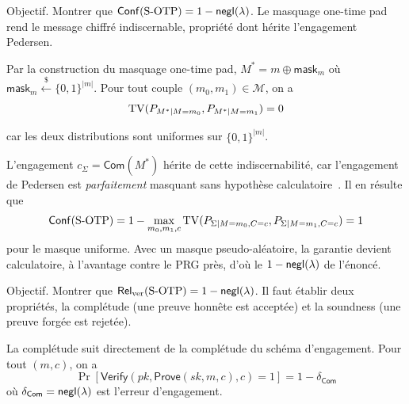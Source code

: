 \begin{sloppypar}
\begin{Preuve}
\begin{cmtEtape}{Objectif.}
Montrer que $\mathsf{Conf}(\text{S-OTP}) = 1 - \mathsf{negl}(\lambda)$. Le masquage
one-time pad rend le message chiffr\'e indiscernable, propri\'et\'e dont
h\'erite l'engagement Pedersen.
\end{cmtEtape}

Par la construction du masquage one-time pad, $M^* = m \oplus \mathsf{mask}_m$
o\`u $\mathsf{mask}_m \xleftarrow{\$} \{0,1\}^{|m|}$. Pour tout couple
$(m_0, m_1) \in \mathcal{M}$, on a
\begin{equation}
\operatorname{TV}(P_{M^*|M=m_0}, P_{M^*|M=m_1}) = 0
\end{equation}

car les deux distributions sont uniformes sur $\{0,1\}^{|m|}$.

L'engagement $c_\Sigma = \mathsf{Com}(M^*)$ h\'erite de cette
indiscernabilit\'e, car l'engagement de Pedersen est \emph{parfaitement} masquant
sans hypoth\`ese calculatoire~\cite{Pedersen91}. Il en r\'esulte que
\begin{equation}
\mathsf{Conf}(\text{S-OTP}) = 1 - \max_{m_0,m_1,c} \operatorname{TV}(P_{\Sigma|M=m_0,C=c}, P_{\Sigma|M=m_1,C=c})
= 1
\end{equation}
pour le masque uniforme. Avec un masque pseudo-al\'eatoire, la garantie devient calculatoire, \`a
l'avantage contre le PRG pr\`es, d'o\`u le $1 - \mathsf{negl}(\lambda)$ de l'\'enonc\'e.
\end{Preuve}

\begin{Preuve}\label{prv:sotp_rel}

\begin{cmtEtape}{Objectif.}
Montrer que $\mathsf{Rel}_{\mathrm{ver}}(\text{S-OTP}) = 1 - \mathsf{negl}(\lambda)$. Il faut
\'etablir deux propri\'et\'es, la compl\'etude (une preuve honn\^ete est accept\'ee) et
la soundness (une preuve forg\'ee est rejet\'ee).
\end{cmtEtape}

La compl\'etude suit directement de la compl\'etude du sch\'ema
d'engagement. Pour tout $(m, c)$, on a
\begin{equation}
\Pr[\mathsf{Verify}(pk, \mathsf{Prove}(sk,m,c), c) = 1]
= 1 - \delta_{\mathsf{Com}}
\end{equation}
o\`u $\delta_{\mathsf{Com}} = \mathsf{negl}(\lambda)$ est l'erreur d'engagement.


\end{Preuve}
\end{sloppypar}
